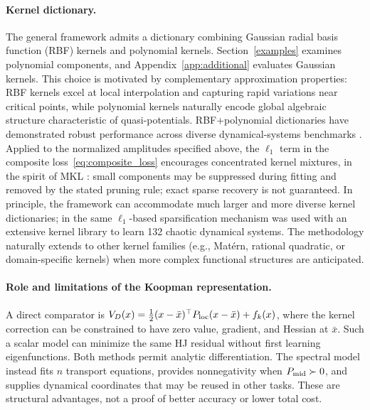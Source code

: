 \documentclass[11pt]{article}
\theoremstyle{plain}      %
\theoremstyle{definition} %
\begin{document}
\paragraph{Kernel dictionary.}
The general framework admits a dictionary combining Gaussian radial basis function (RBF) kernels and polynomial kernels. Section~\ref{examples} examines polynomial components, and Appendix~\ref{app:additional} evaluates Gaussian kernels. This choice is motivated by complementary approximation properties: RBF kernels excel at local interpolation and capturing rapid variations near critical points, while polynomial kernels naturally encode global algebraic structure characteristic of quasi-potentials. RBF+polynomial dictionaries have demonstrated robust performance across diverse dynamical-systems benchmarks \cite{hamzi2021learning}. Applied to the normalized amplitudes specified above, the $\ell_1$ term in the composite loss~\eqref{eq:composite_loss} encourages concentrated kernel mixtures, in the spirit of MKL \cite{lanckriet2004learning, bach2004multiple}: small components may be suppressed during fitting and removed by the stated pruning rule; exact sparse recovery is not guaranteed. In principle, the framework can accommodate much larger and more diverse kernel dictionaries; in \cite{bh_sparse_kfs} the same $\ell_1$-based sparsification mechanism was used with an extensive kernel library to learn 132 chaotic dynamical systems. The methodology naturally extends to other kernel families (e.g., Mat\'ern, rational quadratic, or domain-specific kernels) when more complex functional structures are anticipated.


\paragraph{Role and limitations of the Koopman representation.}\label{sec:koopman-role}
A direct comparator is $V_D(x)=\tfrac12(x-\bar x)^\top P_{\rm loc}(x-\bar x)+f_k(x)$, where the kernel correction can be constrained to have zero value, gradient, and Hessian at $\bar x$. Such a scalar model can minimize the same HJ residual without first learning eigenfunctions. Both methods permit analytic differentiation. The spectral model instead fits $n$ transport equations, provides nonnegativity when $P_{\rm mid}\succ0$, and supplies dynamical coordinates that may be reused in other tasks. These are structural advantages, not a proof of better accuracy or lower total cost.
\end{document}
